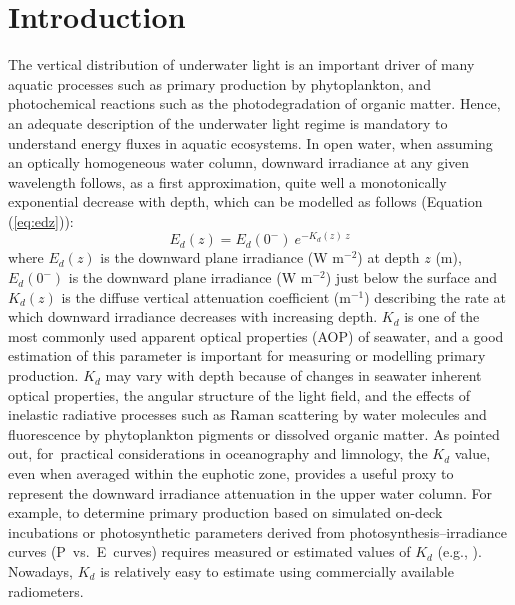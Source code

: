 \documentclass[applsci,article,accept,moreauthors,pdftex,10pt,a4paper]{Definitions/mdpi}
\newcommand{\ked}{\ensuremath{K_{d}}}
\newcommand{\edz}{\ensuremath{{E_d(z)}}}
\newcommand{\edzero}{\ensuremath{{E_d(0^-)}}}
\begin{document}
\section{Introduction}

The vertical distribution of underwater light is an important driver of many aquatic processes such as primary production by phytoplankton, and photochemical reactions such as the photodegradation of organic matter. Hence, an adequate description of the underwater light regime is mandatory to understand energy fluxes in aquatic ecosystems. In open water, when assuming an optically homogeneous water column, downward irradiance at any given wavelength follows, as a first approximation, quite well a monotonically exponential decrease with depth, which can be modelled as follows \citep{Kirk1994} (Equation (\ref{eq:edz})):
\begin{equation}
    \edz{} = \edzero{}~e^{-\ked(z)~z}
    \label{eq:edz}
\end{equation}
where \edz{} is the downward plane irradiance (W m$^{-2}$) at depth $z$ (m), \edzero{} is the downward plane irradiance (W m$^{-2}$) just below the surface and $K_d(z)$ is the diffuse vertical attenuation coefficient \mbox{(m$^{-1}$)} describing the rate at which downward irradiance decreases with increasing depth. \ked{} is one of the most commonly used apparent optical properties (AOP) of seawater, and a good estimation of this parameter is important for measuring or modelling primary production. \ked{} may vary with depth because of changes in seawater inherent optical properties, the angular structure of the light field, and the effects of inelastic radiative processes such as Raman scattering by water molecules and fluorescence by phytoplankton pigments or dissolved organic matter. As \citet{Kirk1994} pointed out, for~practical considerations in oceanography and limnology, the \ked{} value, even when averaged within the euphotic zone, provides a useful proxy to represent the downward irradiance attenuation in the upper water column. For example, to determine primary production based on simulated on-deck incubations or photosynthetic parameters derived from photosynthesis--irradiance curves (P~vs.~E~curves) requires measured or estimated values of \ked{} (e.g., \citet{Morel1996}). Nowadays, \ked{} is relatively easy to estimate using commercially available radiometers.
\end{document}
